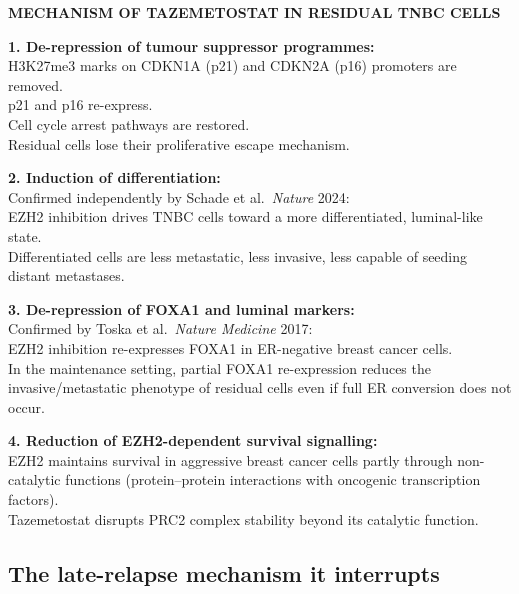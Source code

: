 \documentclass[12pt, a4paper]{article}
\begin{document}
\begin{center}
\colorbox{mechanismbox}{
\begin{minipage}{0.85\textwidth}
\vspace{0.5em}
\textbf{MECHANISM OF TAZEMETOSTAT IN RESIDUAL TNBC CELLS}

\medskip
\textbf{1. De-repression of tumour suppressor programmes:}\\
H3K27me3 marks on CDKN1A (p21) and CDKN2A (p16)
promoters are removed.\\
p21 and p16 re-express.\\
Cell cycle arrest pathways are restored.\\
Residual cells lose their proliferative escape
mechanism.

\medskip
\textbf{2. Induction of differentiation:}\\
Confirmed independently by Schade et al.\
\textit{Nature} 2024:\\
EZH2 inhibition drives TNBC cells toward a more
differentiated, luminal-like state.\\
Differentiated cells are less metastatic,
less invasive, less capable of seeding
distant metastases.

\medskip
\textbf{3. De-repression of FOXA1 and luminal markers:}\\
Confirmed by Toska et al.\ \textit{Nature Medicine}
2017:\\
EZH2 inhibition re-expresses FOXA1 in ER-negative
breast cancer cells.\\
In the maintenance setting, partial FOXA1
re-expression reduces the invasive/metastatic
phenotype of residual cells even if full ER
conversion does not occur.

\medskip
\textbf{4. Reduction of EZH2-dependent survival
signalling:}\\
EZH2 maintains survival in aggressive breast cancer
cells partly through non-catalytic functions
(protein--protein interactions with oncogenic
transcription factors).\\
Tazemetostat disrupts PRC2 complex stability
beyond its catalytic function.
\vspace{0.5em}
\end{minipage}
}
\end{center}

\subsection{The late-relapse mechanism it interrupts}
\end{document}

